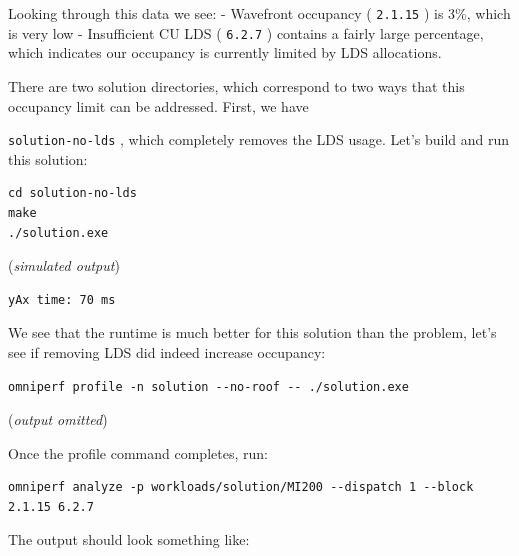 \documentclass[
]{article}
\let\oldtexttt\texttt
\renewcommand{\texttt}[1]{
  \colorbox{Light}{\oldtexttt{#1}}
}
\begin{document}
Looking through this data we see: - Wavefront occupancy
(\texttt{2.1.15}) is 3\%, which is very low - Insufficient CU LDS
(\texttt{6.2.7}) contains a fairly large percentage, which indicates our
occupancy is currently limited by LDS allocations.

There are two solution directories, which correspond to two ways that
this occupancy limit can be addressed. First, we have
\texttt{solution-no-lds}, which completely removes the LDS usage. Let's
build and run this solution:

\begin{verbatim}
cd solution-no-lds
make
./solution.exe
\end{verbatim}

(\emph{simulated output})

\begin{verbatim}
yAx time: 70 ms
\end{verbatim}

We see that the runtime is much better for this solution than the
problem, let's see if removing LDS did indeed increase occupancy:

\begin{verbatim}
omniperf profile -n solution --no-roof -- ./solution.exe
\end{verbatim}

(\emph{output omitted})

Once the profile command completes, run:

\begin{verbatim}
omniperf analyze -p workloads/solution/MI200 --dispatch 1 --block 2.1.15 6.2.7
\end{verbatim}

The output should look something like:
\end{document}
